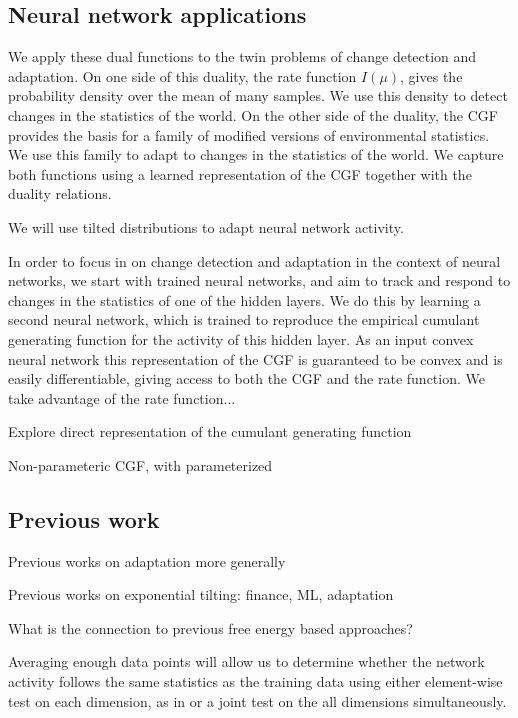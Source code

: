 \documentclass[11pt]{article}      %
\begin{document}
\subsection{Neural network applications}

We apply these dual functions to the twin problems of change detection and adaptation.
On one side of this duality, the rate function $I(\mu)$, gives the probability density over the mean of many samples.
We use this density to detect changes in the statistics of the world.
On the other side of the duality, the CGF provides the basis for a family of modified versions of environmental statistics.
We use this family to adapt to changes in the statistics of the world.
We capture both functions using a learned representation of the CGF together with the duality relations.



We will use tilted distributions to adapt neural network activity.



In order to focus in on change detection and adaptation in the context of neural networks, we start with trained neural networks, and aim to track and respond to changes in the statistics of one of the hidden layers. 
We do this by learning a second neural network, which is trained to reproduce the empirical cumulant generating function for the activity of this hidden layer.
As an input convex neural network \cite{amos_input_2017} this representation of the CGF is guaranteed to be convex and is easily differentiable, giving access to both the CGF and the rate function.
We take advantage of the rate function...




Explore direct representation of the cumulant generating function 

Non-parameteric CGF, with parameterized 



\subsection{Previous work}


Previous works on adaptation more generally

Previous works on exponential tilting: finance, ML, adaptation 


What is the connection to previous free energy based approaches?


Averaging enough data points will allow us to determine whether the network activity follows the same statistics as the training data using either element-wise test on each dimension, as in \cite{rabanser_failing_2019} or a joint test on the all dimensions simultaneously.
\end{document}
